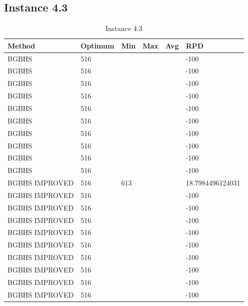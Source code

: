 \subsection{Instance 4.3}
\begin{table}[H]
\centering
\begin{tabular}{ | l | l | l | l | l | l | }
\hline
	Method & Optimum & Min & Max & Avg & RPD \\ \hline
	BGBHS & 516 &  &  &  & -100 \\ \hline
	BGBHS & 516 &  &  &  & -100 \\ \hline
	BGBHS & 516 &  &  &  & -100 \\ \hline
	BGBHS & 516 &  &  &  & -100 \\ \hline
	BGBHS & 516 &  &  &  & -100 \\ \hline
	BGBHS & 516 &  &  &  & -100 \\ \hline
	BGBHS & 516 &  &  &  & -100 \\ \hline
	BGBHS & 516 &  &  &  & -100 \\ \hline
	BGBHS & 516 &  &  &  & -100 \\ \hline
	BGBHS & 516 &  &  &  & -100 \\ \hline
	BGBHS IMPROVED & 516 & 613 &  &  & 18.7984496124031 \\ \hline
	BGBHS IMPROVED & 516 &  &  &  & -100 \\ \hline
	BGBHS IMPROVED & 516 &  &  &  & -100 \\ \hline
	BGBHS IMPROVED & 516 &  &  &  & -100 \\ \hline
	BGBHS IMPROVED & 516 &  &  &  & -100 \\ \hline
	BGBHS IMPROVED & 516 &  &  &  & -100 \\ \hline
	BGBHS IMPROVED & 516 &  &  &  & -100 \\ \hline
	BGBHS IMPROVED & 516 &  &  &  & -100 \\ \hline
	BGBHS IMPROVED & 516 &  &  &  & -100 \\ \hline
	BGBHS IMPROVED & 516 &  &  &  & -100 \\ \hline
\end{tabular}

\caption{Instance 4.3}
\label{tblscp43}
\end{table}
\newpage

